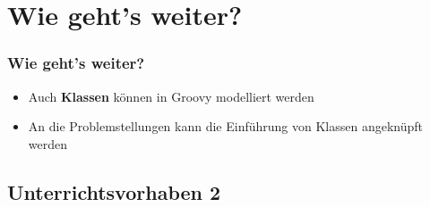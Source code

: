 \documentclass[usenames,dvipsnames]{beamer}
\begin{document}

\section{Wie geht's weiter?}


\begin{frame}
\frametitle{Wie geht's weiter?}
\begin{itemize}
\item Auch \textbf{Klassen} können in Groovy modelliert werden
\item An die Problemstellungen kann die Einführung von Klassen angeknüpft werden 
\end{itemize}
\end{frame}


\subsection{Unterrichtsvorhaben 2}

\end{document}
